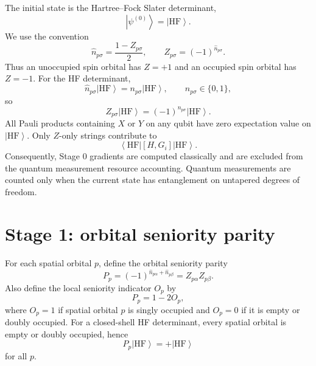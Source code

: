 \documentclass[11pt]{article}
\newcommand{\ket}[1]{\left|#1\right\rangle}
\newcommand{\bra}[1]{\left\langle#1\right|}
\begin{document}
The initial state is the Hartree--Fock Slater determinant,
\begin{equation}
    \ket{\psi^{(0)}}=\ket{\mathrm{HF}}.
\end{equation}
We use the convention
\begin{equation}
    \hat n_{p\sigma}=\frac{1-Z_{p\sigma}}{2},
    \qquad
    Z_{p\sigma}=(-1)^{\hat n_{p\sigma}}.
\end{equation}
Thus an unoccupied spin orbital has $Z=+1$ and an occupied spin orbital has $Z=-1$. For the HF determinant,
\begin{equation}
    \hat n_{p\sigma}\ket{\mathrm{HF}}=n_{p\sigma}\ket{\mathrm{HF}},
    \qquad n_{p\sigma}\in\{0,1\},
\end{equation}
so
\begin{equation}
    Z_{p\sigma}\ket{\mathrm{HF}}=(-1)^{n_{p\sigma}}\ket{\mathrm{HF}}.
\end{equation}
All Pauli products containing $X$ or $Y$ on any qubit have zero expectation value on $\ket{\mathrm{HF}}$. Only $Z$-only strings contribute to
\begin{equation}
    \bra{\mathrm{HF}}[H,G_i]\ket{\mathrm{HF}}.
\end{equation}
Consequently, Stage 0 gradients are computed classically and are excluded from the quantum measurement resource accounting. Quantum measurements are counted only when the current state has entanglement on untapered degrees of freedom.

\section{Stage 1: orbital seniority parity}

For each spatial orbital $p$, define the orbital seniority parity
\begin{equation}
    P_p=(-1)^{\hat n_{p\alpha}+\hat n_{p\beta}}
    = Z_{p\alpha}Z_{p\beta}.
\end{equation}
Also define the local seniority indicator $O_p$ by
\begin{equation}
    P_p = 1-2O_p,
\end{equation}
where $O_p=1$ if spatial orbital $p$ is singly occupied and $O_p=0$ if it is empty or doubly occupied. For a closed-shell HF determinant, every spatial orbital is empty or doubly occupied, hence
\begin{equation}
    P_p\ket{\mathrm{HF}}=+\ket{\mathrm{HF}}
\end{equation}
for all $p$.
\end{document}
